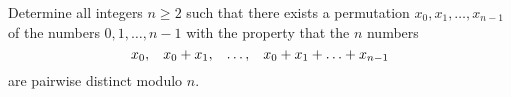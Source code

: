 Determine all integers $n \geq 2$ such that there exists a permutation $x_0, x_1, \ldots, x_{n - 1}$ of the numbers $0, 1, \ldots, n - 1$ with the property that the $n$ numbers$$x_0, \hspace{0.3cm} x_0 + x_1, \hspace{0.3cm} \ldots, \hspace{0.3cm} x_0 + x_1 + \ldots  + x_{n - 1}$$are pairwise distinct modulo $n$.